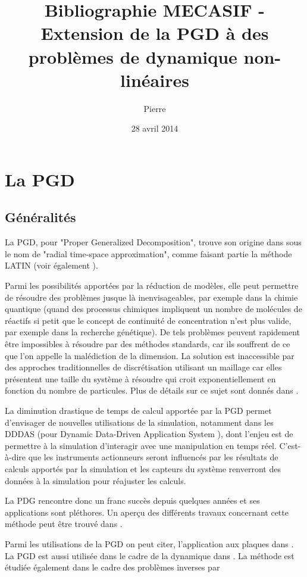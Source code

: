 \documentclass[12pt,a4paper]{report}
\title{Bibliographie MECASIF - Extension de la PGD à des problèmes de dynamique non-linéaires}
\author{Pierre \bsc{Nargil}}
\date{28 avril 2014}
\begin{document}
\renewcommand{\thesection}{\arabic{section}} %
\renewcommand{\contentsname}{Sommaire}
\renewcommand{\labelitemi}{$\bullet$}
\tableofcontents

\clearpage

\section{La PGD}
\subsection{Généralités}
La PGD, pour "Proper Generalized Decomposition", trouve son origine dans \cite{Lad85} sous le nom de "radial time-space approximation", comme faisant partie la méthode LATIN (voir également \cite{Lad89}). 

Parmi les possibilités apportées par la réduction de modèles, elle peut permettre de résoudre des problèmes jusque là inenvisageables, par exem\-ple dans la chimie quantique (quand des processus chimiques impliquent un nombre de molécules de réactifs si petit que le concept de continuité de concentration n'est plus valide, par exemple dans la recherche génétique). De tels problèmes peuvent rapidement être impossibles à résoudre par des méthodes standards, car ils souffrent de ce que l'on appelle la malédiction de la dimension. La solution est inaccessible par des approches traditionnelles de discrétisation utilisant un maillage car elles présentent une taille du système à résoudre qui croit exponentiellement en fonction du nombre de particules. Plus de détails sur ce sujet sont donnés dans \cite{Paradigm}.

La diminution drastique de temps de calcul apportée par la PGD permet d'envisager de nouvelles utilisations de la simulation, notamment dans les DDDAS (pour Dynamic Data-Driven Application System \cite{DDAS}), dont l'enjeu est de permettre à la simulation d'interagir avec une manipulation en temps réel. C'est-à-dire que les instruments actionneurs seront influencés par les résultats de calculs apportés par la simulation et les capteurs du système renverront des données à la simulation pour réajuster les calculs.

La PDG rencontre donc un franc succès depuis quelques années et ses applications sont pléthores. Un aperçu des différents travaux concernant cette méthode peut être trouvé dans \cite{ShortReview}.

Parmi les utilisations de la PGD on peut citer, l'application aux plaques dans \cite{bognet2012advanced}. La PGD est aussi utilisée dans le cadre de la dynamique dans \cite{boucinha2014ideal}. La méthode est étudiée également dans le cadre des problèmes inverses par \cite{louf2013fast,ghnatios2011methodological}
\end{document}
